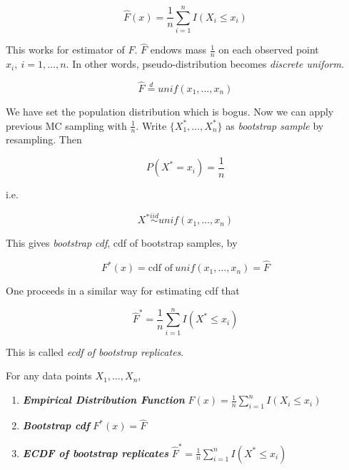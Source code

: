 \documentclass[]{book}
\theoremstyle{definition}
\theoremstyle{definition}
\theoremstyle{definition}
\theoremstyle{remark}
\let\BeginKnitrBlock\begin \let\EndKnitrBlock\end
\begin{document}
\begin{equation}
  \hat{F}(x) = \frac{1}{n} \sum_{i = 1}^n I(X_i \le x_i)
  \label{eq:edistn}
\end{equation}

This works for estimator of \(F\). \(\hat{F}\) endows mass \(\frac{1}{n}\) on each observed point \(x_i, \: i = 1, \ldots, n\). In other words, pseudo-distribution becomes \emph{discrete uniform}.

\begin{equation}
  \hat{F} \stackrel{d}{=} unif(x_1, \ldots, x_n)
  \label{eq:discunif}
\end{equation}

We have set the population distribution which is bogus. Now we can apply previous MC sampling with \(\frac{1}{n}\). Write \(\{ X_1^{\ast}, \ldots, X_n^{\ast} \}\) as \emph{bootstrap sample} by resampling. Then

\[P(X^{\ast} = x_i) = \frac{1}{n}\]

i.e.

\begin{equation}
  X^{\ast} \stackrel{iid}{\sim}unif(x_1, \ldots, x_n)
  \label{eq:bootdistn}
\end{equation}

This gives \emph{bootstrap cdf}, cdf of bootstrap samples, by

\begin{equation}
  F^{\ast}(x) = \text{cdf of}\: unif(x_1, \ldots, x_n) = \hat{F}
  \label{eq:bootcdf}
\end{equation}

One proceeds in a similar way for estimating cdf that

\begin{equation}
  \hat{F}^{\ast} = \frac{1}{n} \sum_{i = 1}^n I(X^{\ast} \le x_i)
  \label{eq:bootecdf}
\end{equation}

This is called \emph{ecdf of bootstrap replicates}.

\BeginKnitrBlock{remark}
{}For any data points \(X_1, \ldots, X_n\),

\begin{enumerate}
  \item \textbf{\textit{Empirical Distribution Function}} $\hat{F}(x) = \frac{1}{n} \sum_{i = 1}^n I(X_i \le x_i)$
  \item \textbf{\textit{Bootstrap cdf}} $F^{\ast}(x) = \hat{F}$
  \item \textbf{\textit{ECDF of bootstrap replicates}} $\hat{F}^{\ast} = \frac{1}{n} \sum_{i = 1}^n I(X^{\ast} \le x_i)$
\end{enumerate}
\EndKnitrBlock{remark}
\end{document}

